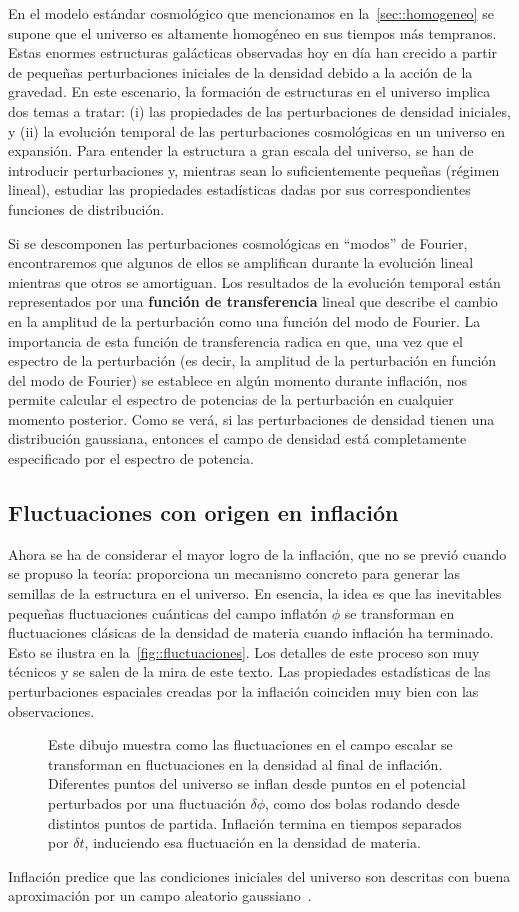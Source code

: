 En el modelo estándar cosmológico que mencionamos en la~\autoref{sec::homogeneo} se supone que el universo es altamente homogéneo en sus tiempos más tempranos. Estas enormes estructuras galácticas observadas hoy en día han crecido a partir de pequeñas perturbaciones iniciales de la densidad debido a la acción de la gravedad. En este escenario, la formación de estructuras en el universo implica dos temas a tratar: (i) las propiedades de las perturbaciones de densidad iniciales, y (ii) la evolución temporal de las perturbaciones cosmológicas en un universo en expansión. Para entender la estructura a gran escala del universo, se han de introducir perturbaciones y, mientras sean lo suficientemente pequeñas (régimen lineal), estudiar las propiedades estadísticas dadas por sus correspondientes funciones de distribución.

Si se descomponen las perturbaciones cosmológicas en ``modos'' de Fourier, encontraremos que algunos de ellos se amplifican durante la evolución lineal mientras que otros se amortiguan. Los resultados de la evolución temporal están representados por una \textbf{función de transferencia} lineal que describe el cambio en la amplitud de la perturbación como una función del modo de Fourier. La importancia de esta función de transferencia radica en que, una vez que el espectro de la perturbación (es decir, la amplitud de la perturbación en función del modo de Fourier) se establece en algún momento durante inflación, nos permite calcular el espectro de potencias de la perturbación en cualquier momento posterior. Como se verá, si las perturbaciones de densidad tienen una distribución gaussiana, entonces el campo de densidad está completamente especificado por el espectro de potencia.
\subsection{Fluctuaciones con origen en inflación}
Ahora se ha de considerar el mayor logro de la inflación, que no se previó cuando se propuso la teoría: proporciona un mecanismo concreto para generar las semillas de la estructura en el universo. En esencia, la idea es que las inevitables pequeñas fluctuaciones cuánticas del campo inflatón \(\phi\) se transforman en fluctuaciones clásicas de la densidad de materia cuando inflación ha terminado. Esto se ilustra en la~\autoref{fig::fluctuaciones}. Los detalles de este proceso son muy técnicos y se salen de la mira de este texto. Las propiedades estadísticas de las perturbaciones espaciales creadas por la inflación coinciden muy bien con las observaciones.
\begin{figure}
    \centering
    \def\svgwidth{0.95\textwidth}
    
    \caption[Fluctuaciones cuánticas a clásicas]{Este dibujo muestra como las fluctuaciones en el campo escalar se transforman en fluctuaciones en la densidad al final de inflación. Diferentes puntos del universo se inflan desde puntos en el potencial perturbados por una fluctuación \(\delta\phi\), como dos bolas rodando desde distintos puntos de partida. Inflación termina en tiempos separados por \(\delta t\), induciendo esa fluctuación en la densidad de materia.}
    \label{fig::fluctuaciones}
\end{figure}


Inflación predice que las condiciones iniciales del universo son descritas con buena aproximación por un campo aleatorio gaussiano~\cite{baumann2022cosmology,dodelson2020modern}.